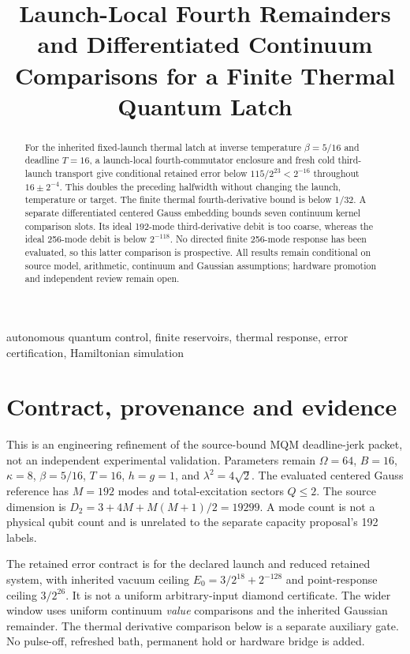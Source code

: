 \documentclass[a4paper,conference]{IEEEtran}
\begin{document}
\title{Launch-Local Fourth Remainders and Differentiated Continuum Comparisons for a Finite Thermal Quantum Latch}
\author{}
\maketitle
\begin{abstract}
For the inherited fixed-launch thermal latch at inverse temperature $\beta=5/16$ and deadline $T=16$, a launch-local fourth-commutator enclosure and fresh cold third-launch transport give conditional retained error below $115/2^{23}<2^{-16}$ throughout $16\pm2^{-4}$. This doubles the preceding halfwidth without changing the launch, temperature or target. The finite thermal fourth-derivative bound is below $1/32$. A separate differentiated centered Gauss embedding bounds seven continuum kernel comparison slots. Its ideal 192-mode third-derivative debit is too coarse, whereas the ideal 256-mode debit is below $2^{-118}$. No directed finite 256-mode response has been evaluated, so this latter comparison is prospective. All results remain conditional on source model, arithmetic, continuum and Gaussian assumptions; hardware promotion and independent review remain open.
\end{abstract}
\begin{IEEEkeywords}
autonomous quantum control, finite reservoirs, thermal response, error certification, Hamiltonian simulation
\end{IEEEkeywords}
\section{Contract, provenance and evidence}
This is an engineering refinement of the source-bound MQM deadline-jerk packet, not an independent experimental validation. Parameters remain $\Omega=64$, $B=16$, $\kappa=8$, $\beta=5/16$, $T=16$, $h=g=1$, and $\lambda^2=4\sqrt2$. The evaluated centered Gauss reference has $M=192$ modes and total-excitation sectors $Q\le2$. The source dimension is $D_2=3+4M+M(M+1)/2=19299$. A mode count is not a physical qubit count and is unrelated to the separate capacity proposal's 192 labels.

The retained error contract is for the declared launch and reduced retained system, with inherited vacuum ceiling $E_0=3/2^{18}+2^{-128}$ and point-response ceiling $3/2^{26}$. It is not a uniform arbitrary-input diamond certificate. The wider window uses uniform continuum \emph{value} comparisons and the inherited Gaussian remainder. The thermal derivative comparison below is a separate auxiliary gate. No pulse-off, refreshed bath, permanent hold or hardware bridge is added.
\end{document}
